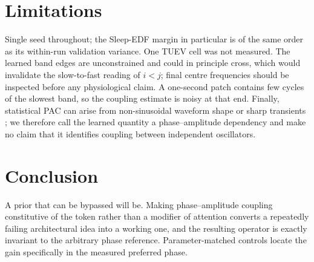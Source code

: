 \documentclass{article}
\begin{document}
\section{Limitations}

Single seed throughout; the Sleep-EDF margin in particular is of the same order
as its within-run validation variance. One TUEV cell was not measured. The
learned band edges are unconstrained and could in principle cross, which would
invalidate the slow-to-fast reading of $i<j$; final centre frequencies should be
inspected before any physiological claim. A one-second patch contains few cycles
of the slowest band, so the coupling estimate is noisy at that end. Finally,
statistical PAC can arise from non-sinusoidal waveform shape or sharp transients
\citep{kramer2008spurious,cole2017waveform,aru2015untangling}; we therefore call
the learned quantity a phase--amplitude dependency and make no claim that it
identifies coupling between independent oscillators.

\section{Conclusion}

A prior that can be bypassed will be. Making phase--amplitude coupling
constitutive of the token rather than a modifier of attention converts a
repeatedly failing architectural idea into a working one, and the resulting
operator is exactly invariant to the arbitrary phase reference. Parameter-matched
controls locate the gain specifically in the measured preferred phase.



\end{document}
